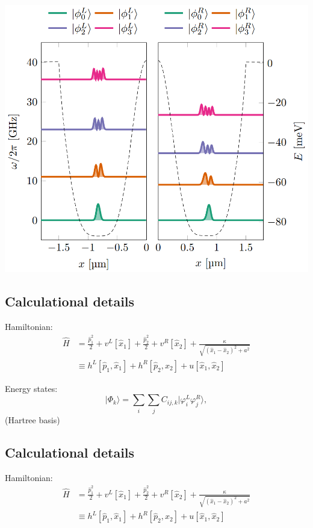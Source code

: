 \documentclass[%
oneside,                 %
final,                   %
10pt]{article}
\begin{document}
\centerline{\includegraphics[width=0.9\linewidth]{qcfigures/Hartree_states.png}}

\vspace{6mm}

\subsection{Calculational details}

Hamiltonian:
\begin{align}
\hat{H} &= \frac{\hat{p}_1^2}{2} + v^L[\hat{x}_1] + \frac{\hat{p}_2^2}{2} + v^R[\hat{x}_2] + \frac{\kappa}{\sqrt{(\hat{x}_1-\hat{x}_2)^2 + a^2}} \\
&\equiv h^L[\hat{p}_1,\hat{x}_1] + h^R[\hat{p}_2,\hat{x}_2] + u[\hat{x}_1,\hat{x}_2]
\end{align}

Energy states:
\begin{equation}
\vert\Phi_k\rangle = \sum_{i} \sum_{j} C_{ij, k}\vert \varphi^L_i \varphi^R_j\rangle,
\end{equation}
(Hartree basis)

\subsection{Calculational details}

Hamiltonian:
\begin{align}
\hat{H} &= \frac{\hat{p}_1^2}{2} + v^L[\hat{x}_1] + \frac{\hat{p}_2^2}{2} + v^R[\hat{x}_2] + \frac{\kappa}{\sqrt{(\hat{x}_1-\hat{x}_2)^2 + a^2}} \\
&\equiv h^L[\hat{p}_1,\hat{x}_1] + h^R[\hat{p}_2,\hat{x}_2] + u[\hat{x}_1,\hat{x}_2]
\end{align}
\end{document}
